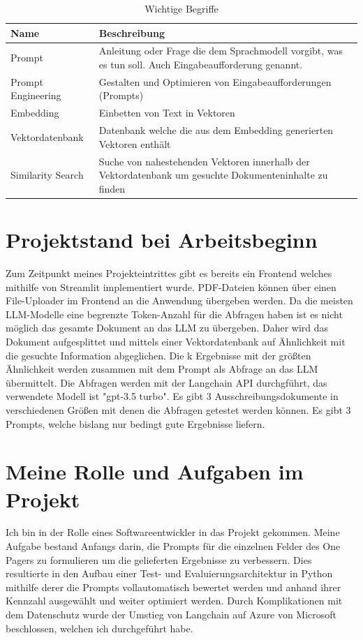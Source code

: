 \begin{table}[H]
    \centering
    \caption{Wichtige Begriffe}
    \label{tab:technologien}
    \begin{tabular}{|>{\centering\arraybackslash}m{4cm}|p{10cm}|} %
    \hline
    \textbf{Name} & \textbf{Beschreibung} \\ \hline
    Prompt & Anleitung oder Frage die dem Sprachmodell vorgibt, was es tun soll. Auch Eingabeaufforderung genannt. \\ \hline
    Prompt Engineering & Gestalten und Optimieren von Eingabeaufforderungen (Prompts) \\ \hline
    Embedding & Einbetten von Text in Vektoren \\ \hline
    Vektordatenbank & Datenbank welche die aus dem Embedding generierten Vektoren enthält \\ \hline
    Similarity Search & Suche von nahestehenden Vektoren innerhalb der Vektordatenbank um gesuchte Dokumenteninhalte zu finden \\ \hline
    \end{tabular}
\end{table}

\section{Projektstand bei Arbeitsbeginn}
Zum Zeitpunkt meines Projekteintrittes gibt es bereits ein Frontend welches mithilfe von Streamlit implementiert wurde. 
PDF-Dateien können über einen File-Uploader im Frontend an die Anwendung übergeben werden. Da die meisten LLM-Modelle eine 
begrenzte Token-Anzahl für die Abfragen haben ist es nicht möglich das gesamte Dokument an das LLM zu übergeben. 
Daher wird das Dokument aufgesplittet und mittels einer Vektordatenbank auf Ähnlichkeit mit die gesuchte Information 
abgeglichen. Die k Ergebnisse mit der größten Ähnlichkeit werden zusammen mit dem Prompt als Abfrage an das LLM übermittelt. 
Die Abfragen werden mit der Langchain API durchgführt, das verwendete Modell ist "gpt-3.5 turbo". Es gibt 3 Ausschreibungsdokumente 
in verschiedenen Größen mit denen die Abfragen getestet werden können. Es gibt 3 Prompts, welche bislang nur bedingt gute 
Ergebnisse liefern.

\section{Meine Rolle und Aufgaben im Projekt}
Ich bin in der Rolle eines Softwareentwickler in das Projekt gekommen. Meine Aufgabe bestand Anfangs darin, die Prompts für die einzelnen 
Felder des One Pagers zu formulieren um die gelieferten Ergebnisse zu verbessern. Dies resultierte in den Aufbau einer 
Test- und Evaluierungsarchitektur in Python mithilfe derer die Prompts vollautomatisch bewertet werden und anhand ihrer Kennzahl 
ausgewählt und weiter optimiert werden. Durch Komplikationen mit dem Datenschutz wurde der Umstieg von Langchain auf 
Azure von Microsoft beschlossen, welchen ich durchgeführt habe. 

